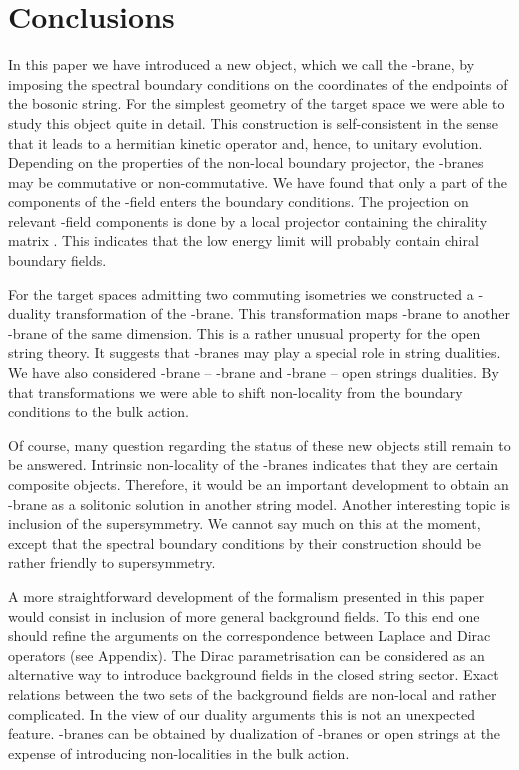 \documentclass[a4paper,12pt,twoside]{article}
\begin{document}
\section{Conclusions}
In this paper we have introduced a new object, which we
call the \coordHE{}-brane, by imposing the spectral boundary conditions
on the coordinates of the endpoints of the bosonic string.
For the simplest geometry of the target space we were able
to study this object quite in detail. This construction
is self-consistent in the sense that it leads to a hermitian
kinetic operator and, hence, to unitary evolution. Depending on
the properties of the non-local boundary projector, the \coordHE{}-branes
may be commutative or non-commutative. We have found that only a part
of the components of the \coordHE{}-field enters the boundary conditions.
The projection on relevant \coordHE{}-field components is done by
a local projector containing the chirality matrix \coordHE{}.
This indicates that the low energy limit will probably
contain chiral boundary fields.

For the target spaces admitting two commuting isometries
we constructed a \coordHE{}-duality transformation of the \coordHE{}-brane.
This transformation maps \coordHE{}-brane to another \coordHE{}-brane
of the same dimension.
This is a rather unusual property for the open string
theory. It suggests that \coordHE{}-branes may play a special
role in string dualities. We have also considered \coordHE{}-brane --
\coordHE{}-brane and \coordHE{}-brane -- open strings dualities. By that
transformations we were able to shift non-locality from the
boundary conditions to the bulk action.

Of course, many question regarding the status of these new
objects still remain to be answered. Intrinsic non-locality
of the \coordHE{}-branes indicates that they are certain composite
objects. Therefore, it would be an important development
to obtain an \coordHE{}-brane as a solitonic solution in another
string model. Another interesting topic is inclusion of the
supersymmetry. We cannot say much on this at the moment, 
except that the spectral boundary conditions by their
construction should be rather friendly to supersymmetry.

A more straightforward development of the formalism presented
in this paper would consist in inclusion of more general
background fields. To this end one should refine the
arguments on the correspondence between Laplace and Dirac
operators (see Appendix). The Dirac parametrisation can be
considered as an alternative way to introduce background
fields in the closed string sector. Exact relations between
the two sets of the background fields are non-local and
rather complicated. In the view of our duality arguments
this is not an unexpected feature. \coordHE{}-branes can be obtained
by dualization of \coordHE{}-branes or open strings at the expense
of introducing non-localities in the bulk action. 
\end{document}
